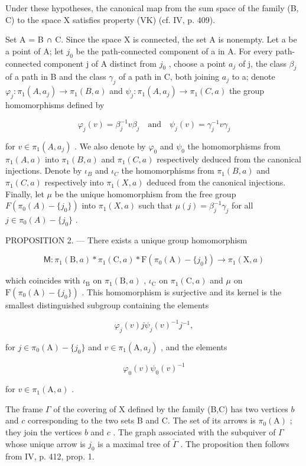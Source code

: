 Under these hypotheses, the canonical map from the sum space of the family (B, C) to the space X satisfies property (VK) (cf. IV, p. 409).

Set A = B ∩ C. Since the space X is connected, the set A is nonempty. Let a be a point of A; let \(j_{0}\) be the path-connected component of a in A. For every path-connected component j of A distinct from \(j_{0}\) , choose a point \(a_{j}\) of j, the class \(\beta_{j}\) of a path in B and the class \(\gamma_{j}\) of a path in C, both joining \(a_{j}\) to a; denote \(\varphi_{j}\colon\pi_{1}(A,a_{j})\to\pi_{1}(B,a)\) and \(\psi_{j}\colon\pi_{1}(A,a_{j})\to\pi_{1}(C,a)\) the group homomorphisms defined by

\[
\varphi_ {j} (v) = \beta_ {j} ^ {- 1} v \beta_ {j} \quad \text {and} \quad \psi_ {j} (v) = \gamma_ {j} ^ {- 1} v \gamma_ {j}
\]

for \(v \in \pi_1(A, a_j)\) . We also denote by \(\varphi_0\) and \(\psi_0\) the homomorphisms from \(\pi_1(A, a)\) into \(\pi_1(B, a)\) and \(\pi_1(C, a)\) respectively deduced from the canonical injections. Denote by \(\iota_B\) and \(\iota_C\) the homomorphisms from \(\pi_1(B, a)\) and \(\pi_1(C, a)\) respectively into \(\pi_1(X, a)\) deduced from the canonical injections. Finally, let \(\mu\) be the unique homomorphism from the free group \(F(\pi_0(A) - \{j_0\})\) into \(\pi_1(X, a)\) such that \(\mu(j) = \beta_j^{-1}\gamma_j\) for all \(j \in \pi_0(A) - \{j_0\}\) .

PROPOSITION 2. --- There exists a unique group homomorphism

\[
\mathsf {M} \colon \pi_ {1} (\mathrm{B}, a) * \pi_ {1} (\mathrm{C}, a) * \mathrm{F} (\pi_ {0} (\mathrm{A}) - \{j _ {0} \}) \to \pi_ {1} (\mathrm{X}, a)
\]

which coincides with \(\iota_{\mathrm{B}}\) on \(\pi_1(\mathrm{B},a)\) , \(\iota_{\mathrm{C}}\) on \(\pi_1(\mathrm{C},a)\) and \(\mu\) on \(\mathrm{F}(\pi_0(\mathrm{A}) - \{j_0\})\) . This homomorphism is surjective and its kernel is the smallest distinguished subgroup containing the elements

\[
\varphi_ {j} (v) j \psi_ {j} (v) ^ {- 1} j ^ {- 1},
\]

for \(j\in \pi_0(\mathrm{A}) - \{j_0\}\) and \(v\in \pi_1(\mathrm{A},a_j)\) , and the elements

\[
\varphi_ {0} (v) \psi_ {0} (v) ^ {- 1}
\]

for \(v \in \pi_1(\mathrm{A}, a)\) .

The frame \(\Gamma\) of the covering of X defined by the family (B,C) has two vertices \(b\) and \(c\) corresponding to the two sets B and C. The set of its arrows is \(\pi_0(\mathrm{A})\) ; they join the vertices \(b\) and \(c\) . The graph associated with the subquiver of \(\Gamma\) whose unique arrow is \(j_0\) is a maximal tree of \(\widetilde{\Gamma}\) . The proposition then follows from IV, p. 412, prop. 1.

